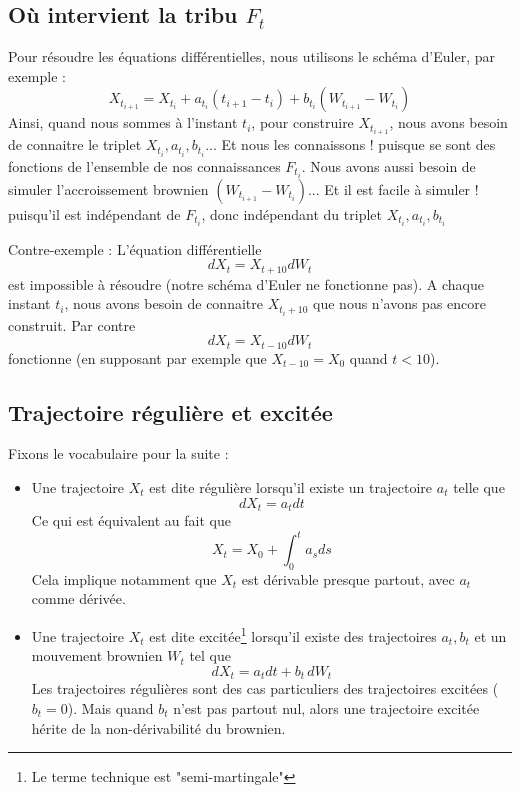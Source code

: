\documentclass{article}
\begin{document}
\subsection{Où intervient la tribu $F_t$}

Pour résoudre les équations différentielles, nous utilisons le schéma d'Euler, par exemple :  
$$
X_{t_{i+1}} =  X_{t_i} +    a_{t_i} (t_{i+1} -t_i)   + b_{t_i} (W_{t_{i+1}}- W_{t_i}) 
$$
Ainsi, quand nous sommes à l'instant $t_i$, pour construire $X_{t_{i+1}}$, nous avons besoin de connaitre le triplet $X_{t_i},a_{t_i},b_{t_i}$... Et nous les connaissons !  puisque se sont des fonctions de l'ensemble de nos connaissances $F_{t_i}$.  Nous avons aussi besoin  de simuler l'accroissement brownien $(W_{t_{i+1}}- W_{t_i}) $... Et il est facile à simuler ! puisqu'il est indépendant de $F_{t_i}$, donc indépendant du triplet $X_{t_i},a_{t_i},b_{t_i}$


Contre-exemple : L'équation différentielle
$$
dX_t =   X_{t+ 10} dW_t
$$
est impossible à résoudre (notre schéma d'Euler ne fonctionne pas). A chaque instant $t_i$, nous avons besoin de connaitre $X_{t_i + 10}$ que nous n'avons pas encore construit. Par contre
$$
dX_t = X_{t-10} dW_t
$$
fonctionne (en supposant par exemple que $X_{t-10}=X_0$ quand $t<10$). 
 
 
 

\subsection{Trajectoire régulière et excitée}



Fixons le vocabulaire pour la suite :
\begin{itemize}
\item Une trajectoire  $X_t$ est dite régulière lorsqu'il existe un trajectoire $a_t$ telle que
$$
dX_t = a_t dt
$$
Ce qui est équivalent au fait que
$$
X_t = X_0 + \int_0^t a_s ds 
$$
Cela implique notamment que $X_t$ est dérivable presque partout, avec  $a_t$ comme dérivée. 
\item Une trajectoire $X_t$ est dite excitée\footnote{Le terme technique est "semi-martingale"}  lorsqu'il existe des trajectoires $a_t,b_t$ et un  mouvement brownien $W_t$ tel que
$$
dX_t= a_t dt + b_t \, dW_t 
$$
Les trajectoires régulières sont des cas particuliers des trajectoires excitées ($b_t=0$). Mais quand $b_t$ n'est pas partout nul, alors une trajectoire excitée hérite de la non-dérivabilité du brownien. 
\end{itemize}
\end{document}
